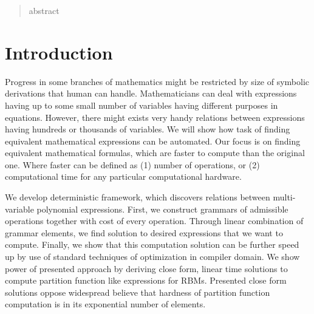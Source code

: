 \documentclass{article}
\begin{document}
 


\icmladdress{}


\vskip 0.3in


\begin{abstract} 
abstract 
\end{abstract} 


\section{Introduction} \label{introduction}
Progress in some branches of mathematics might be restricted by size of symbolic derivations that human can handle. 
Mathematicians can deal with expressions having up to some small number of variables having different purposes in equations. However,
there might exists very handy relations between expressions having hundreds or thousands of variables. We will show how
task of finding equivalent mathematical expressions can be automated. Our focus is on finding equivalent mathematical formulas, which
are faster to compute than the original one. Where faster can be defined as (1) number of operations, or (2) computational time for any
particular computational hardware.


We develop deterministic framework, which discovers relations between multi-variable polynomial expressions. First, we 
construct grammars of admissible operations together with cost of every operation. Through linear combination of grammar
elements, we find solution to desired expressions that we want to compute. Finally, we show that this computation solution can be 
further speed up by use of standard techniques of optimization in compiler domain. We show power of presented approach
by deriving close form, linear time solutions to compute partition function like expressions for RBMs. Presented close form solutions
oppose widespread believe that hardness of partition function computation is in its exponential number of elements.



\iffalse
Add Karol and Yoram as the authors

Consider how to prune expansion of graphs

Consider synthethic example like finding rule for det of structurazed sparsity etc.

How to generalize and find rules fast ? How to do proper optimizations.
\fi
\end{document}
